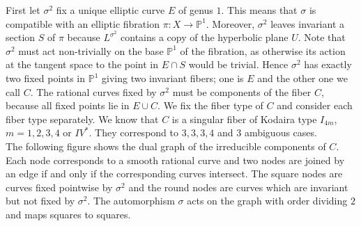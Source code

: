 \documentclass[a4paper]{amsart}
\theoremstyle{definition}
\theoremstyle{plain}
\newcommand{\PP}{\mathbb{P}}
\begin{document}
First let $\sigma^2$ fix a unique elliptic curve $E$ of genus $1$. This means that $\sigma$ is compatible with an elliptic fibration $\pi\colon X \to \PP^1$.
Moreover, $\sigma^2$ leaves invariant a section $S$ of $\pi$ because $L^{\sigma^2}$ contains a copy of the hyperbolic plane $U$. Note that $\sigma^2$ must act non-trivially on the base $\PP^1$ of the fibration, as otherwise its action at the tangent space to the point in $E\cap S$ would be trivial.
Hence $\sigma^2$ has exactly two fixed points in $\PP^1$ giving two invariant fibers; one is $E$ and the other one we call $C$.
The rational curves fixed by $\sigma^2$ must be components of the fiber $C$, because all fixed points lie in $E \cup C$.
We fix the fiber type of $C$ and consider each fiber type separately.
We know that $C$ is a singular fiber of Kodaira type $I_{4m}$, $m=1,2,3,4$ or $IV^*$. They correspond to $3,3,3,4$ and $3$ ambiguous cases.\\[4pt]
%
%
%
%
%
%
%
%
%
%
%
%
%
%
%
%
%
%
%
%
The following figure shows the dual graph of the irreducible components of $C$. Each node corresponds to a smooth rational curve and two nodes are joined by an edge if and only if the corresponding curves intersect. The square nodes are curves fixed pointwise by $\sigma^2$ and the round nodes are curves which are invariant but not fixed by $\sigma^2$.
The automorphism $\sigma$ acts on the graph with order dividing $2$ and maps squares to squares.
\end{document}
